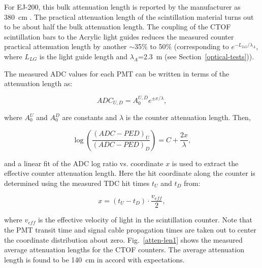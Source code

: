 \documentclass{elsart}
\begin{document}
For EJ-200, this bulk attenuation length is reported by the manufacturer as 380~cm
\cite{scint-spec}. The practical attenuation length of the scintillation material turns out to 
be about half the bulk attenuation length. The coupling of the CTOF scintillation bars to the 
Acrylic light guides reduces the measured counter practical attenuation length by another 
$\sim$35\% to 50\% (corresponding to $e^{-L_{LG}/\lambda_A}$, where $L_{LG}$ is the light guide 
length and $\lambda_A$=2.3~m (see Section~\ref{optical-tests})).

The measured ADC values for each PMT can be written in terms of the attenuation length as:

\begin{equation}
\label{al-adc}
ADC_{U,D} = A_0^{U,D} e^{\pm x/\lambda},
\end{equation}

\noindent
where $A_0^U$ and $A_0^D$ are constants and $\lambda$ is the counter attenuation length. Then,

\begin{equation}
\label{linear}
\log \left( \frac{(ADC-PED)_U}{(ADC-PED)_D} \right ) = C + \frac{2x}{\lambda}, 
\end{equation}

\noindent
and a linear fit of the ADC log ratio vs. coordinate $x$ is used to extract the effective counter attenuation
length. Here the hit coordinate along the counter is determined using the measured TDC hit times $t_U$
and $t_D$ from:

\begin{equation}
\label{coor}
x = (t_U - t_D) \cdot \frac{v_{eff}}{2},
\end{equation}

\noindent
where $v_{eff}$ is the effective velocity of light in the scintillation counter. Note that the PMT transit
time and signal cable propagation times are taken out to center the coordinate distribution about zero.
Fig.~\ref{atten-len1} shows the measured average attenuation lengths for the CTOF counters. The 
average attenuation length is found to be 140~cm in accord with expectations. 
\end{document}
